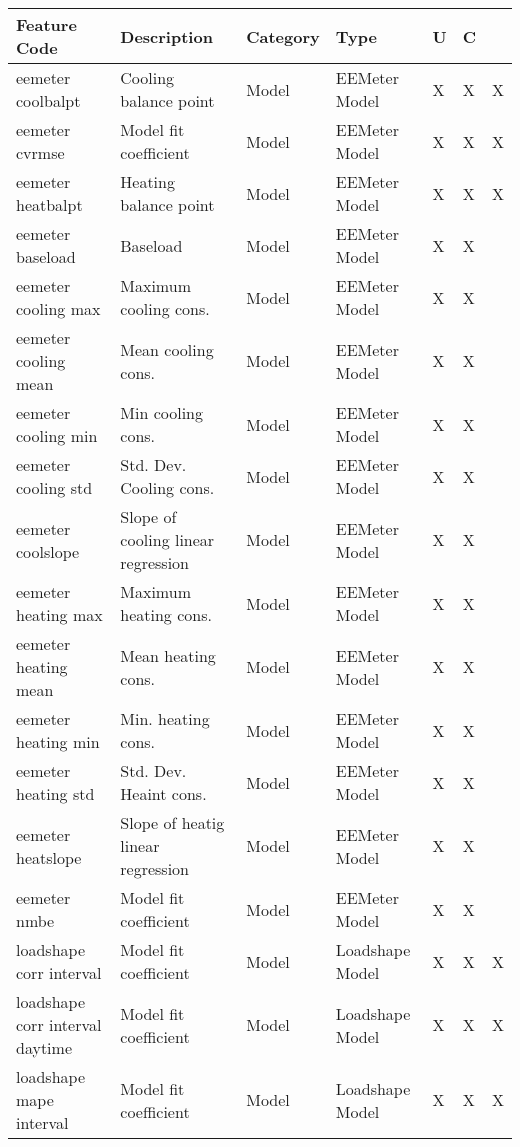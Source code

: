 {{\begin{longtable}[l]{ | p{4cm} | p{4cm} | p{1cm} | p{2cm} | p{0.3cm} | p{0.3cm} | p{0.3cm} |}
\hline
	Feature Code & Description & Category & Type & U & C &  \\ \hline
	 eemeter coolbalpt & Cooling balance point & Model & EEMeter Model & X & X & X \\ \hline
	 eemeter cvrmse & Model fit coefficient & Model & EEMeter Model & X & X & X \\ \hline
	 eemeter heatbalpt & Heating balance point & Model & EEMeter Model & X & X & X \\ \hline
	 eemeter baseload & Baseload & Model & EEMeter Model & X & X & \  \\ \hline
	 eemeter cooling max & Maximum cooling cons. & Model & EEMeter Model & X & X & \  \\ \hline
	 eemeter cooling mean & Mean cooling cons. & Model & EEMeter Model & X & X & \  \\ \hline
	 eemeter cooling min & Min cooling cons. & Model & EEMeter Model & X & X & \  \\ \hline
	 eemeter cooling std & Std. Dev. Cooling cons. & Model & EEMeter Model & X & X & \  \\ \hline
	 eemeter coolslope & Slope of cooling linear regression & Model & EEMeter Model & X & X & \  \\ \hline
	 eemeter heating max & Maximum heating cons. & Model & EEMeter Model & X & X & \  \\ \hline
	 eemeter heating mean & Mean heating cons. & Model & EEMeter Model & X & X & \  \\ \hline
	 eemeter heating min & Min. heating cons. & Model & EEMeter Model & X & X & \  \\ \hline
	 eemeter heating std & Std. Dev. Heaint cons. & Model & EEMeter Model & X & X & \  \\ \hline
	 eemeter heatslope & Slope of heatig linear regression & Model & EEMeter Model & X & X & \  \\ \hline
	 eemeter nmbe & Model fit coefficient & Model & EEMeter Model & X & X & \  \\ \hline
	 loadshape corr interval & Model fit coefficient & Model & Loadshape Model & X & X & X \\ \hline
	 loadshape corr interval daytime & Model fit coefficient & Model & Loadshape Model & X & X & X \\ \hline
	 loadshape mape interval & Model fit coefficient & Model & Loadshape Model & X & X & X \\ \hline

\end{longtable}}}
